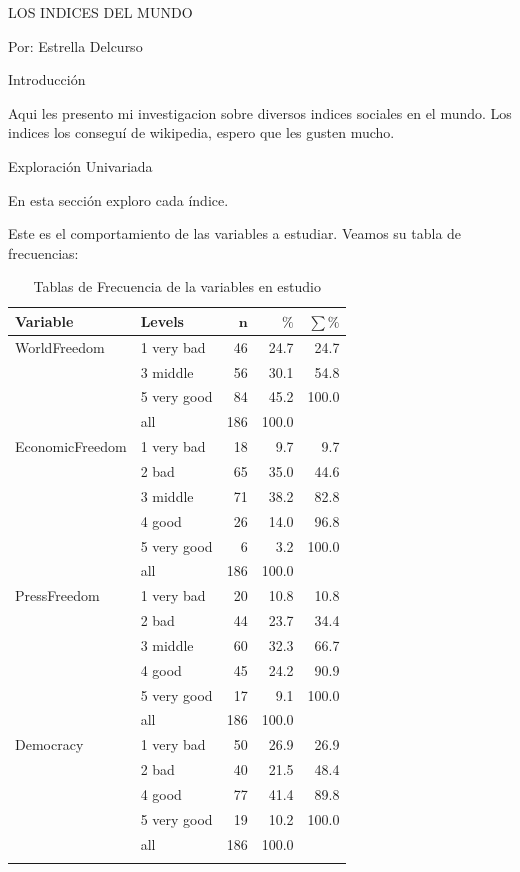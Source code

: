 \documentclass{article}
\begin{document}


LOS INDICES DEL MUNDO


Por: Estrella Delcurso


Introducción

Aqui les presento mi investigacion sobre diversos indices sociales en el mundo. Los indices los conseguí de wikipedia, espero que les gusten mucho.


Exploración Univariada

En esta sección exploro cada índice.




Este es el comportamiento de las variables a estudiar. Veamos su tabla de frecuencias:

\begingroup\footnotesize
\begin{longtable}{llrrr}
\caption{Tablas de Frecuencia de la variables en estudio} \\ 
 \textbf{Variable} & \textbf{Levels} & $\mathbf{n}$ & $\mathbf{\%}$ & $\mathbf{\sum \%}$ \\ 
  \hline \hline
WorldFreedom & 1 very bad & 46 & 24.7 & 24.7 \\ 
   & 3 middle & 56 & 30.1 & 54.8 \\ 
   & 5 very good & 84 & 45.2 & 100.0 \\ 
   \hline
 & all & 186 & 100.0 &  \\ 
   \hline
\hline
EconomicFreedom & 1 very bad & 18 & 9.7 & 9.7 \\ 
   & 2 bad & 65 & 35.0 & 44.6 \\ 
   & 3 middle & 71 & 38.2 & 82.8 \\ 
   & 4 good & 26 & 14.0 & 96.8 \\ 
   & 5 very good & 6 & 3.2 & 100.0 \\ 
   \hline
 & all & 186 & 100.0 &  \\ 
   \hline
\hline
PressFreedom & 1 very bad & 20 & 10.8 & 10.8 \\ 
   & 2 bad & 44 & 23.7 & 34.4 \\ 
   & 3 middle & 60 & 32.3 & 66.7 \\ 
   & 4 good & 45 & 24.2 & 90.9 \\ 
   & 5 very good & 17 & 9.1 & 100.0 \\ 
   \hline
 & all & 186 & 100.0 &  \\ 
   \hline
\hline
Democracy & 1 very bad & 50 & 26.9 & 26.9 \\ 
   & 2 bad & 40 & 21.5 & 48.4 \\ 
   & 4 good & 77 & 41.4 & 89.8 \\ 
   & 5 very good & 19 & 10.2 & 100.0 \\ 
   \hline
 & all & 186 & 100.0 &  \\ 
   \hline
\hline
\hline
\label{}
\end{longtable}
\endgroup
\end{document}
